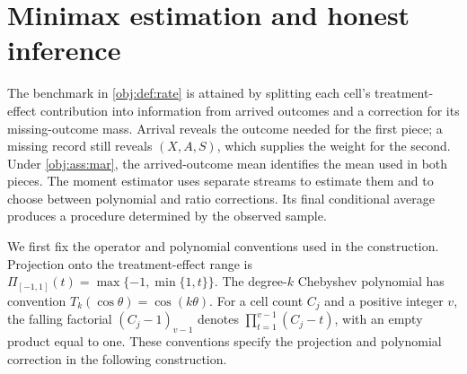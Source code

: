 \section{Minimax estimation and honest inference}

The benchmark in \cref{obj:def:rate} is attained by splitting each cell's treatment-effect contribution into information from arrived outcomes and a correction for its missing-outcome mass. Arrival reveals the outcome needed for the first piece; a missing record still reveals \((X,A,S)\), which supplies the weight for the second. Under \cref{obj:ass:mar}, the arrived-outcome mean identifies the mean used in both pieces. The moment estimator  uses separate streams to estimate them and to choose between polynomial and ratio corrections. Its final conditional average produces a procedure determined by the observed sample.

We first fix the operator and polynomial conventions used in the construction. Projection onto the treatment-effect range is
\(\Pi_{[-1,1]}(t)=\max\{-1,\min\{1,t\}\}\).
The degree-\(k\) Chebyshev polynomial  has convention
\(T_k(\cos\theta)=\cos(k\theta)\).
For a cell count \(C_j\) and a positive integer \(v\), the falling factorial
\((C_j-1)_{v-1}\) denotes \(\prod_{t=1}^{v-1}(C_j-t)\), with an empty product equal to one. These conventions specify the projection and polynomial correction in the following construction.

